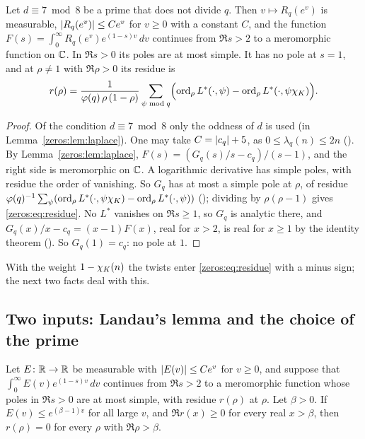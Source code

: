 \begin{proposition}\label{zeros:prop:poles}
Let $d \equiv 7 \bmod 8$ be a prime that does not divide $q$. Then $v \mapsto R_q(e^v)$ is
measurable, $\lvert R_q(e^v)\rvert \le C e^v$ for $v \ge 0$ with a constant $C$, and the function
$F(s) = \int_0^\infty R_q(e^v) e^{(1-s)v}\,dv$ continues from $\Re s > 2$ to a meromorphic function
on $\mathbb{C}$. In $\Re s > 0$ its poles are at most simple. It has no pole at $s = 1$, and at
$\rho \ne 1$ with $\Re \rho > 0$ its residue is
\begin{equation}\label{zeros:eq:residue}
  r(\rho) = \frac{1}{\varphi(q)\,\rho\,(1-\rho)} \sum_{\psi \bmod q}
     \Bigl( \operatorname{ord}_{\rho} L^*(\cdot,\psi) - \operatorname{ord}_{\rho} L^*(\cdot,\psi\chi_K) \Bigr).
\end{equation}
\end{proposition}

\begin{proof}
Of the condition $d \equiv 7 \bmod 8$ only the oddness of $d$ is used (in
Lemma~\ref{zeros:lem:laplace}). One may take $C = \lvert c_q\rvert + 5$, as $0 \le \lambda_q(n) \le 2n$
(). By Lemma~\ref{zeros:lem:laplace},
$F(s) = (G_q(s)/s - c_q)/(s-1)$, and the right side is
meromorphic on $\mathbb{C}$. A logarithmic derivative has simple poles, with residue the order of
vanishing. So $G_q$ has at most a simple pole at $\rho$, of residue
$\varphi(q)^{-1} \sum_\psi (\operatorname{ord}_\rho L^*(\cdot,\psi\chi_K) - \operatorname{ord}_\rho L^*(\cdot,\psi))$
(); dividing by $\rho(\rho - 1)$ gives
\eqref{zeros:eq:residue}. No $L^*$ vanishes on $\Re s \ge 1$, so $G_q$ is analytic there, and
$G_q(x)/x - c_q = (x-1)F(x)$, real for $x > 2$, is real for $x \ge 1$ by the identity theorem
(). So $G_q(1) = c_q$: no pole at $1$.
\end{proof}

With the weight $1 - \chi_K(n)$ the twists enter \eqref{zeros:eq:residue} with a minus sign; the
next two facts deal with this.

\subsection{Two inputs: Landau's lemma and the choice of the prime}

\begin{fact}\label{zeros:fact:landau}
Let $E \colon \mathbb{R} \to \mathbb{R}$ be measurable with $\lvert E(v)\rvert \le C e^v$ for $v \ge 0$, and suppose that
$\int_0^\infty E(v) e^{(1-s)v}\,dv$ continues from $\Re s > 2$ to a meromorphic function whose
poles in $\Re s > 0$ are at most simple, with residue $r(\rho)$ at $\rho$. Let $\beta > 0$. If
$E(v) \le e^{(\beta-1)v}$ for all large $v$, and $\Re r(x) \ge 0$ for every real $x > \beta$, then
$r(\rho) = 0$ for every $\rho$ with $\Re \rho > \beta$.
\end{fact}

